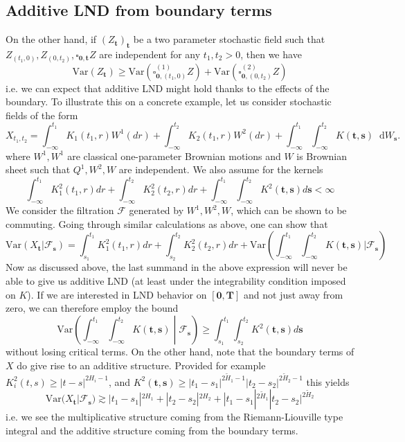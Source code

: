 \documentclass[11pt,oneside,english,reqno]{amsart}
\numberwithin{equation}{section}
\numberwithin{figure}{section}
\theoremstyle{plain}
\theoremstyle{definition}
\theoremstyle{remark}
\theoremstyle{plain}
\theoremstyle{plain}
\theoremstyle{plain}
\theoremstyle{plain}
\theoremstyle{plain}
\newcommand{\bT}{\mathbf{T}}
\newcommand{\boo}{\mathbf{0}}
\newcommand{\bs}{\mathbf{s}}
\newcommand{\bt}{\mathbf{t}}
\newcommand{\dd}{\mathop{}\!\mathrm{d}}
\begin{document}
\subsection*{Additive LND from boundary terms} On the other hand, if $(Z_\bt)_\bt$ be a two parameter stochastic field such that  $Z_{(t_1, 0)}, Z_{(0, t_2)}, \square_{\boo,\bt}Z$ are independent for any $t_1, t_2>0$, then we have 
\[
\mbox{Var}(Z_\bt)\geq \mbox{Var}(\square^{(1)}_{\boo, (t_1, 0)}Z)+\mbox{Var}(\square^{(2)}_{\boo, (0, t_2)}Z)
\]
i.e. we can expect that additive LND might hold thanks to the effects of the boundary. To illustrate this on a concrete example, let us consider stochastic fields of the form
\begin{equation}
    X_{t_1, t_2} = \int_{-\infty}^{t_1}K_1(t_1, r)W^1(dr)+\int_{-\infty}^{t_2}K_2(t_1, r)W^2(dr) + \int_{-\infty}^{t_1}\int_{-\infty}^{t_2} K(\bt,\bs) \dd W_\bs.
\end{equation}
where $W^1, W^1$ are classical one-parameter Brownian motions and $W$ is Brownian sheet such that $Q^1, W^2, W$ are independent. We also assume for the kernels
\[
\int_{-\infty}^{t_1}K^2_1(t_1, r)dr+\int_{-\infty}^{t_2}K^2_2(t_2, r)dr+\int_{-\infty}^{t_1}\int_{-\infty}^{t_2}K^2(\bt, \bs)d\bs<\infty
\]
We consider the filtration $\mathcal{F}$ generated by $W^1, W^2, W$, which can be shown to be commuting. Going through similar calculations as above, one can show that 
\begin{equation}
    \mbox{Var}(X_\bt |\mathcal{F}_\bs)= \int_{s_1}^{t_1}K_1^2(t_1, r)dr+\int_{s_2}^{t_2}K_2^2(t_2, r)dr+\mbox{Var}\left(\int_{-\infty}^{t_1}\int_{-\infty}^{t_2}K(\bt, \bs)|\mathcal{F}_\bs\right)
\end{equation}
Now as discussed above, the last summand in the above expression will never be able to give us additive LND (at least under the integrability condition imposed on $K$). If we are interested in LND behavior on $[\boo, \bT]$ and not just away from zero, we can therefore employ the bound 
\begin{equation}\label{term:mult-part}
\mbox{Var}\left(\int_{-\infty}^{t_1}\int_{-\infty}^{t_2}K(\bt, \bs)\middle\vert\mathcal{F}_\bs\right)\geq \int_{s_1}^{t_1}\int_{s_2}^{t_2}K^2(\bt, \bs)d\bs 
\end{equation}
without losing critical terms. On the other hand, note that the boundary terms of $X$ do give rise to an additive structure. Provided for example $K_i^2(t, s)\geq |t-s|^{2H_i-1}$, and $K^2(\bt, \bs)\geq |t_1-s_1|^{2\tilde{H}_1-1}|t_2-s_2|^{2\tilde{H}_2-1}$ this yields 
\begin{equation*}
      \mbox{Var}(X_\bt |\mathcal{F}_\bs)\gtrsim |t_1-s_1|^{2H_1}+|t_2-s_2|^{2H_2}+|t_1-s_1|^{2\tilde{H}_1}|t_2-s_2|^{2\tilde{H}_2}
\end{equation*}
i.e. we see the multiplicative structure coming from the Riemann-Liouville type integral and the additive structure coming from the boundary terms. 
\end{document}
